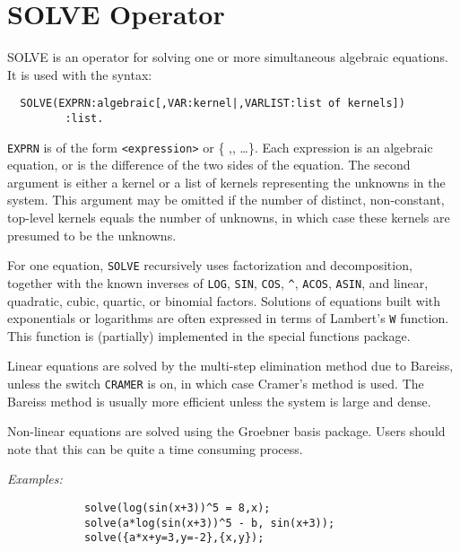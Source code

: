 \section{SOLVE Operator}
\hypertarget{operator:SOLVE}{}
SOLVE is an operator for solving one or more simultaneous algebraic
equations. It is used with the syntax:
\begin{verbatim}
  SOLVE(EXPRN:algebraic[,VAR:kernel|,VARLIST:list of kernels])
         :list.
\end{verbatim}
{\tt EXPRN} is of the form {\tt <expression>} or
\{ {\tt <expression1>},{\tt <expression2>}, \dots \}.  Each expression is an
algebraic equation, or is the difference of the two sides of the equation.
The second argument is either a kernel or a list of kernels representing
the unknowns in the system.  This argument may be omitted if the number of
distinct, non-constant, top-level kernels equals the number of unknowns,
in which case these kernels are presumed to be the unknowns.

For one equation, {\tt SOLVE} recursively uses
factorization and decomposition, together with the known inverses of
{\tt LOG}, {\tt SIN}, {\tt COS}, {\tt \verb|^|}, {\tt ACOS}, {\tt ASIN}, and
linear, quadratic, cubic, quartic, or binomial factors. Solutions
of equations built with exponentials or logarithms are often
expressed in terms of Lambert's {\tt W} function.
This function is (partially) implemented in the special functions package.

\hypertarget{switch:CRAMER}{}
Linear equations are solved by the multi-step elimination method due to
Bareiss, unless the switch {\tt CRAMER} is on, in which
case Cramer's method is used.  The Bareiss method is usually more
efficient unless the system is large and dense.

Non-linear equations are solved using the Groebner basis package.
 Users should note that this can be quite a
time consuming process.

{\it Examples:}
\begin{verbatim}
            solve(log(sin(x+3))^5 = 8,x);
            solve(a*log(sin(x+3))^5 - b, sin(x+3));
            solve({a*x+y=3,y=-2},{x,y});
\end{verbatim}


